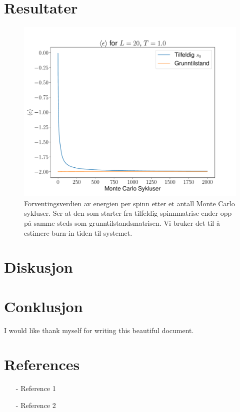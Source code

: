 \documentclass[reprint,english,notitlepage]{revtex4-2}  %
\begin{document}
\section{Resultater}
\begin{figure}[H]
	\centering
	\includegraphics[scale=0.4, trim=1.7cm 0 0 0 ]{../Images/meanepsT1L20.pdf}
	\caption{Forventingsverdien av energien per spinn etter et antall Monte Carlo sykluser. Ser at den som starter fra tilfeldig spinnmatrise ender opp på samme steds som grunntilstandsmatrisen. Vi bruker det til å estimere burn-in tiden til systemet.}
	\label{Fig:5e1}
\end{figure}

\section{Diskusjon}
\section{Conklusjon}
\begin{acknowledgments}  %
I would like thank myself for writing this beautiful document.
\end{acknowledgments}


\section*{References}  %
\begin{itemize}
\item[-]Reference 1
\item[-]Reference 2
\end{itemize}
\end{document}
